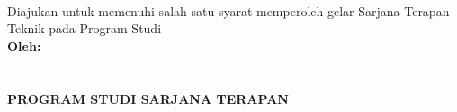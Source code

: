 \begin{titlepage}
    \begin{center}

        \begin{doublespace}
            \textbf{\MakeUppercase{\large{\tipe}}}\\[0.5cm]\textbf{\MakeUppercase{\normalsize{\judulid}}}\\ \textbf{\large \MakeUppercase {\normalsize{\tempat}}} \\[3cm]
            
        \end{doublespace}
        Diajukan untuk memenuhi salah satu syarat memperoleh gelar Sarjana Terapan Teknik pada Program Studi {\prodi} {\departemen} {\fakultas} {\universitas}\\[3cm]
        

        \textbf{\normalsize {Oleh:}} \\
        \textbf{\normalsize \MakeUppercase{\underline{\penulis}}} \\
        \textbf{\normalsize \MakeUppercase{{\nim}}} \\[5cm]


        \textbf{\normalsize \MakeUppercase{Program Studi Sarjana Terapan\\ \prodi}}\\
        \textbf{\normalsize \MakeUppercase{\departemen}}\\
        \textbf{\normalsize \MakeUppercase{\fakultas}}\\
        \textbf{\normalsize \MakeUppercase{\universitas}}\\
        \textbf{\normalsize \the\year{}}\\
    \end{center}
\end{titlepage}